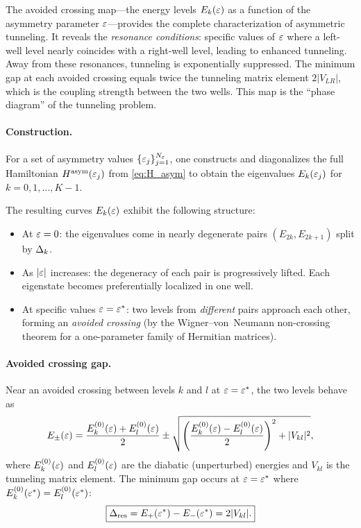 \begin{remark}
The avoided crossing map---the energy levels $E_k(\varepsilon)$ as a function of the asymmetry parameter $\varepsilon$---provides the complete characterization of asymmetric tunneling.
It reveals the \emph{resonance conditions}: specific values of $\varepsilon$ where a left-well level nearly coincides with a right-well level, leading to enhanced tunneling.
Away from these resonances, tunneling is exponentially suppressed.
The minimum gap at each avoided crossing equals twice the tunneling matrix element $2|V_{LR}|$, which is the coupling strength between the two wells.
This map is the ``phase diagram'' of the tunneling problem.
\end{remark}

\paragraph{Construction.}

For a set of asymmetry values $\{\varepsilon_j\}_{j=1}^{N_\varepsilon}$, one constructs and diagonalizes the full Hamiltonian $H^{\text{asym}}(\varepsilon_j)$ from \cref{eq:H_asym} to obtain the eigenvalues $E_k(\varepsilon_j)$ for $k = 0, 1, \ldots, K-1$.

The resulting curves $E_k(\varepsilon)$ exhibit the following structure:
\begin{itemize}
  \item At $\varepsilon = 0$: the eigenvalues come in nearly degenerate pairs $(E_{2k}, E_{2k+1})$ split by $\Delta_k$.
  \item As $|\varepsilon|$ increases: the degeneracy of each pair is progressively lifted. Each eigenstate becomes preferentially localized in one well.
  \item At specific values $\varepsilon = \varepsilon^*$: two levels from \emph{different} pairs approach each other, forming an \emph{avoided crossing} (by the Wigner--von~Neumann non-crossing theorem for a one-parameter family of Hermitian matrices).
\end{itemize}

\paragraph{Avoided crossing gap.}

Near an avoided crossing between levels $k$ and $l$ at $\varepsilon = \varepsilon^*$, the two levels behave as
\begin{equation}
  E_\pm(\varepsilon) = \frac{E_k^{(0)}(\varepsilon) + E_l^{(0)}(\varepsilon)}{2}
  \pm \sqrt{\left(\frac{E_k^{(0)}(\varepsilon) - E_l^{(0)}(\varepsilon)}{2}\right)^2 + |V_{kl}|^2},
\end{equation}
where $E_k^{(0)}(\varepsilon)$ and $E_l^{(0)}(\varepsilon)$ are the diabatic (unperturbed) energies and $V_{kl}$ is the tunneling matrix element.
The minimum gap occurs at $\varepsilon = \varepsilon^*$ where $E_k^{(0)}(\varepsilon^*) = E_l^{(0)}(\varepsilon^*)$:
\begin{equation}\label{eq:avoided_gap}
  \boxed{\Delta_{\text{res}} = E_+(\varepsilon^*) - E_-(\varepsilon^*) = 2|V_{kl}|.}
\end{equation}

